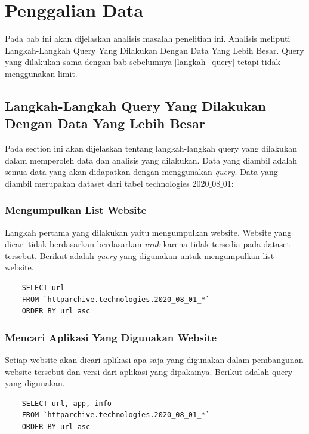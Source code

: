 \chapter{Penggalian Data}
\label{chap:penggalian data}
Pada bab ini akan dijelaskan analisis masalah penelitian ini. Analisis meliputi Langkah-Langkah Query Yang Dilakukan Dengan Data Yang Lebih Besar. Query yang dilakukan sama dengan bab sebelumnya \ref{langkah_query} tetapi tidak menggunakan limit.

\section{Langkah-Langkah Query Yang Dilakukan Dengan Data Yang Lebih Besar}
Pada section ini akan dijelaskan tentang langkah-langkah query yang dilakukan dalam memperoleh data dan analisis yang dilakukan. Data yang diambil adalah semua data yang akan didapatkan dengan menggunakan \textit{query}. Data yang diambil merupakan dataset dari tabel technologies 2020$\_$08$\_$01:

\subsection{Mengumpulkan List Website}
Langkah pertama yang dilakukan yaitu mengumpulkan website. Website yang dicari tidak berdasarkan berdasarkan \textit{rank} karena tidak tersedia pada dataset tersebut. Berikut adalah \textit{query} yang digunakan untuk mengumpulkan list website.
\begin{lstlisting}
	SELECT url
	FROM `httparchive.technologies.2020_08_01_*`
	ORDER BY url asc
\end{lstlisting}

\subsection{Mencari Aplikasi Yang Digunakan Website}
Setiap website akan dicari aplikasi apa saja yang digunakan dalam pembangunan website tersebut dan versi dari aplikasi yang dipakainya. Berikut adalah query yang digunakan.
\begin{lstlisting}
	SELECT url, app, info
	FROM `httparchive.technologies.2020_08_01_*`
	ORDER BY url asc
\end{lstlisting}

